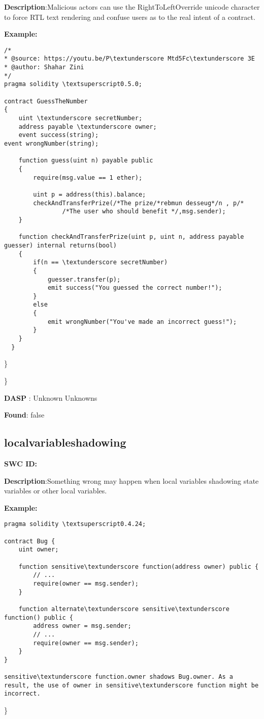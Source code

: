 \documentclass{article}
\begin{document}
\textbf{Description}:Malicious actors can use the Right\textendash To\textendash Left\textendash Override unicode character to force RTL text rendering and confuse users as to the real intent of a contract.


\textbf{Example:} 
\begin{verbatim}
/*
* @source: https://youtu.be/P\textunderscore Mtd5Fc\textunderscore 3E
* @author: Shahar Zini
*/
pragma solidity \textsuperscript0.5.0;

contract GuessTheNumber
{
    uint \textunderscore secretNumber;
    address payable \textunderscore owner;
    event success(string);
event wrongNumber(string);

    function guess(uint n) payable public
    {
        require(msg.value == 1 ether);

        uint p = address(this).balance;
        checkAndTransferPrize(/*The prize/*rebmun desseug*/n , p/*
                /*The user who should benefit */,msg.sender);
    }

    function checkAndTransferPrize(uint p, uint n, address payable guesser) internal returns(bool)
    {
        if(n == \textunderscore secretNumber)
        {
            guesser.transfer(p);
            emit success("You guessed the correct number!");
        }
        else
        {
            emit wrongNumber("You've made an incorrect guess!");
        }
    }
  }

\end{verbatim}\} 

\} 

\textbf{DASP} : Unknown Unknowns

\textbf{Found}: false

\subsection{local\textunderscore variable\textunderscore shadowing} 
\textbf{SWC \textunderscore ID:} 

\textbf{Description}:Something wrong may happen when local variables shadowing state variables or other local variables.


\textbf{Example:} 
\begin{verbatim}
pragma solidity \textsuperscript0.4.24;

contract Bug {
    uint owner;

    function sensitive\textunderscore function(address owner) public {
        // ...
        require(owner == msg.sender);
    }

    function alternate\textunderscore sensitive\textunderscore function() public {
        address owner = msg.sender;
        // ...
        require(owner == msg.sender);
    }
}

sensitive\textunderscore function.owner shadows Bug.owner. As a result, the use of owner in sensitive\textunderscore function might be incorrect.

\end{verbatim}\} 
\end{document}
